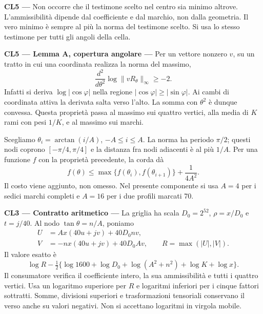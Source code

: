 \documentclass[11pt,a4paper]{article}
\newcommand{\CL}[1]{\textbf{#1 --- }}
\newcommand{\norm}[1]{\lVert#1\rVert}
\begin{document}
\CL{CL5} Non occorre che il testimone scelto nel centro sia minimo altrove. L'ammissibilità dipende dal coefficiente e dal marchio, non dalla geometria. Il vero minimo è sempre al più la norma del testimone scelto. Si usa lo stesso testimone per tutti gli angoli della cella.

\CL{CL5 --- Lemma A, copertura angolare} Per un vettore nonzero $v$, su un tratto in cui una coordinata realizza la norma del massimo,
\[
\frac{d^2}{d\theta^2}\log\norm{vR_\theta}_\infty\ge-2.
\]
Infatti si deriva $\log|\cos\varphi|$ nella regione $|\cos\varphi|\ge|\sin\varphi|$. Ai cambi di coordinata attiva la derivata salta verso l'alto. La somma con $\theta^2$ è dunque convessa. Questa proprietà passa al massimo sui quattro vertici, alla media di $K$ rami con pesi $1/K$, e al massimo sui marchi.

Scegliamo $\theta_i=\arctan(i/A)$, $-A\le i\le A$. La norma ha periodo $\pi/2$; questi nodi coprono $[-\pi/4,\pi/4]$ e la distanza fra nodi adiacenti è al più $1/A$. Per una funzione $f$ con la proprietà precedente, la corda dà
\[
f(\theta)\le\max\{f(\theta_i),f(\theta_{i+1})\}+\frac1{4A^2}.
\tag{A}
\]
Il costo viene aggiunto, non omesso. Nel presente componente si usa $A=4$ per i sedici marchi completi e $A=16$ per i due profili marcati 70.

\CL{CL3 --- Contratto aritmetico} La griglia ha scala $D_0=2^{52}$, $\rho=x/D_0$ e $t=j/40$. Al nodo $\tan\theta=n/A$, poniamo
\[
\begin{split}
U&=Ax(40u+jv)+40D_0nv,\\
V&=-nx(40u+jv)+40D_0Av,\qquad R=\max(|U|,|V|).
\end{split}
\]
Il valore esatto è
\[
\log R-\tfrac12\{\log1600+\log D_0+\log(A^2+n^2)+\log K+\log x\}.
\tag{N}
\]
Il consumatore verifica il coefficiente intero, la sua ammissibilità e tutti i quattro vertici. Usa un logaritmo superiore per $R$ e logaritmi inferiori per i cinque fattori sottratti. Somme, divisioni superiori e trasformazioni tensoriali conservano il verso anche su valori negativi. Non si accettano logaritmi in virgola mobile.
\end{document}
